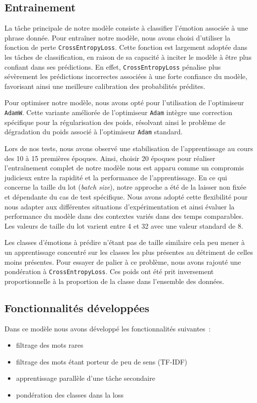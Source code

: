 \documentclass{article}
\begin{document}
\subsection{Entrainement}
La tâche principale de notre modèle consiste à classifier l'émotion associée à une phrase donnée. 
Pour entraîner notre modèle, nous avons choisi d'utiliser la fonction de perte \texttt{CrossEntropyLoss}. 
Cette fonction est largement adoptée dans les tâches de classification, en raison de sa capacité à inciter le modèle à être plus confiant dans ses prédictions. 
En effet, \texttt{CrossEntropyLoss} pénalise plus sévèrement les prédictions incorrectes associées à une forte confiance du modèle, favorisant ainsi une meilleure calibration des probabilités prédites. 

Pour optimiser notre modèle, nous avons opté pour l'utilisation de l'optimiseur \texttt{AdamW}. 
Cette variante améliorée de l'optimiseur \texttt{Adam} intègre une correction spécifique pour la régularisation des poids, résolvant ainsi le problème de dégradation du poids associé à l'optimiseur \texttt{Adam} standard. 

Lors de nos tests, nous avons observé une stabilisation de l'apprentissage au cours des 10 à 15 premières époques. 
Ainsi, choisir 20 époques pour réaliser l'entraînement complet de notre modèle nous est apparu comme un compromis judicieux entre la rapidité et la performance de l'apprentissage.
En ce qui concerne la taille du lot (\textit{batch size}), notre approche a été de la laisser non fixée et dépendante du cas de test spécifique. 
Nous avons adopté cette flexibilité pour nous adapter aux différentes situations d'expérimentation et ainsi évaluer la performance du modèle dans des contextes variés dans des temps comparables. 
Les valeurs de taille du lot varient entre 4 et 32 avec une valeur standard de 8.

Les classes d'émotions à prédire n'étant pas de taille similaire cela peu mener à un apprentissage concentré sur les classes les plus présentes au détriment de celles moins présentes.
Pour essayer de palier à ce problème, nous avons rajouté une pondération à \texttt{CrossEntropyLoss}.
Ces poids ont été prit inversement proportionnelle à la proportion de la classe dans l'ensemble des données.

\subsection{Fonctionnalités développées}
Dans ce modèle nous avons développé les fonctionnalités suivantes :
\begin{itemize}
    \item filtrage des mots rares
    \item filtrage des mots étant porteur de peu de sens (TF-IDF)
    \item apprentissage parallèle d'une tâche secondaire
    \item pondération des classes dans la loss
\end{itemize}
\end{document}
